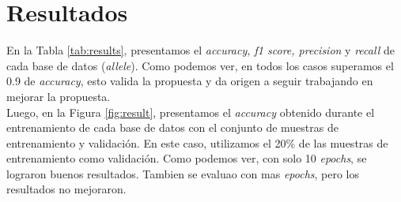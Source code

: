 \chapter{Resultados}
\label{cap:resultados}






En la Tabla \ref{tab:results}, presentamos el \textit{accuracy, f1 score, precision} y \textit{recall} de cada base de datos (\textit{allele}). Como podemos ver, en todos los casos superamos el 0.9 de \textit{accuracy}, esto valida la propuesta y da origen a seguir trabajando en mejorar la propuesta. \\

Luego, en la Figura \ref{fig:result}, presentamos el \textit{accuracy} obtenido durante el entrenamiento de cada base de datos con el conjunto de muestras de entrenamiento y validación. En este caso, utilizamos el 20\% de las muestras de entrenamiento como validación. Como podemos ver, con solo 10 \textit{epochs},  se lograron buenos resultados. Tambien se evaluao con mas \textit{epochs}, pero los resultados no mejoraron.


